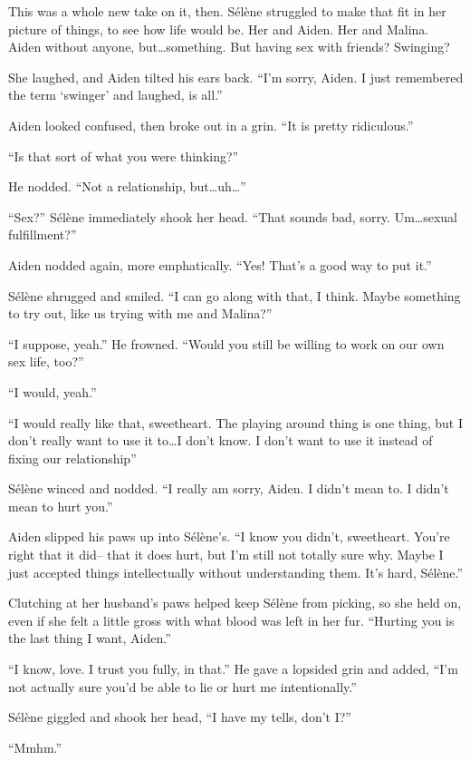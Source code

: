 This was a whole new take on it, then. Sélène struggled to make that fit in her picture of things, to see how life would be. Her and Aiden. Her and Malina. Aiden without anyone, but\ldots{}something. But having sex with friends? Swinging?

She laughed, and Aiden tilted his ears back. ``I'm sorry, Aiden. I just remembered the term `swinger' and laughed, is all.''

Aiden looked confused, then broke out in a grin. ``It is pretty ridiculous.''

``Is that sort of what you were thinking?''

He nodded. ``Not a relationship, but\ldots{}uh\ldots{}''

``Sex?'' Sélène immediately shook her head. ``That sounds bad, sorry. Um\ldots{}sexual fulfillment?''

Aiden nodded again, more emphatically. ``Yes! That's a good way to put it.''

Sélène shrugged and smiled. ``I can go along with that, I think. Maybe something to try out, like us trying with me and Malina?''

``I suppose, yeah.'' He frowned. ``Would you still be willing to work on our own sex life, too?''

``I would, yeah.''

``I would really like that, sweetheart. The playing around thing is one thing, but I don't really want to use it to\ldots{}I don't know. I don't want to use it instead of fixing our relationship''

Sélène winced and nodded. ``I really am sorry, Aiden. I didn't mean to. I didn't mean to hurt you.''

Aiden slipped his paws up into Sélène's. ``I know you didn't, sweetheart. You're right that it did-- that it does hurt, but I'm still not totally sure why. Maybe I just accepted things intellectually without understanding them. It's hard, Sélène.''

Clutching at her husband's paws helped keep Sélène from picking, so she held on, even if she felt a little gross with what blood was left in her fur. ``Hurting you is the last thing I want, Aiden.''

``I know, love. I trust you fully, in that.'' He gave a lopsided grin and added, ``I'm not actually sure you'd be able to lie or hurt me intentionally.''

Sélène giggled and shook her head, ``I have my tells, don't I?''

``Mmhm.''

